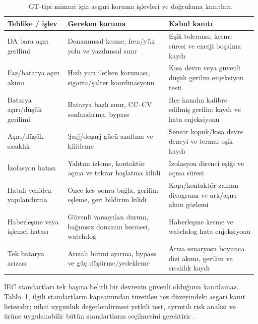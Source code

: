 \begin{table}[H]
  \centering
  \caption{\juriistegietiketi\ GT-tipi mimari için asgari koruma işlevleri ve doğrulama kanıtları.}
  \label{tab:gt-koruma-dogrulama}
  \small
  \begin{tabularx}{\textwidth}{@{}p{}p{}X@{}}
    \toprule
    Tehlike / işlev & Gereken koruma & Kabul kanıtı \\
    \midrule
    DA bara aşırı gerilimi & Donanımsal kesme, fren/yük yolu ve yazılımsal sınır & Eşik toleransı, kesme süresi ve enerji boşalma kaydı \\
    Faz/batarya aşırı akımı & Hızlı yarı iletken koruması, sigorta/şalter koordinasyonu & Kısa devre veya güvenli düşük gerilim enjeksiyon testi \\
    Batarya aşırı/düşük gerilimi & Batarya bazlı sınır, CC--CV sonlandırma, bypass & Her kanalın kalibre edilmiş gerilim kaydı ve hata enjeksiyonu \\
    Aşırı/düşük sıcaklık & Şarj/deşarj gücü azaltma ve kilitleme & Sensör kopuk/kısa devre deneyi ve termal eşik kaydı \\
    İzolasyon hatası & Yalıtım izleme, kontaktör açma ve tekrar başlatma kilidi & İzolasyon direnci eşiği ve açma süresi \\
    Hatalı yeniden yapılandırma & Önce kes--sonra bağla, gerilim eşleme, geri bildirim kilidi & Kapı/kontaktör zaman diyagramı ve ark/aşırı akım gözlemi \\
    Haberleşme veya işlemci hatası & Güvenli varsayılan durum, bağımsız donanım kesmesi, watchdog & Haberleşme kesme ve watchdog hata enjeksiyonu \\
    Tek batarya arızası & Arızalı birimi ayırma, bypass ve güç düşürme/yedekleme & Arıza senaryosu boyunca dizi akımı, gerilim ve sıcaklık kaydı \\
    \bottomrule
  \end{tabularx}
\end{table}

IEC standartları tek başına belirli bir devrenin güvenli olduğunu kanıtlamaz. Tablo~\ref{tab:gt-koruma-dogrulama}, ilgili standartların kapsamından türetilen tez düzeyindeki asgari kanıt listesidir; nihai uygunluk değerlendirmesi yetkili test, ayrıntılı risk analizi ve ürüne uygulanabilir bütün standartların seçilmesini gerektirir \citep{IEC62619,IEC62477,IEC62933_5_2}.


